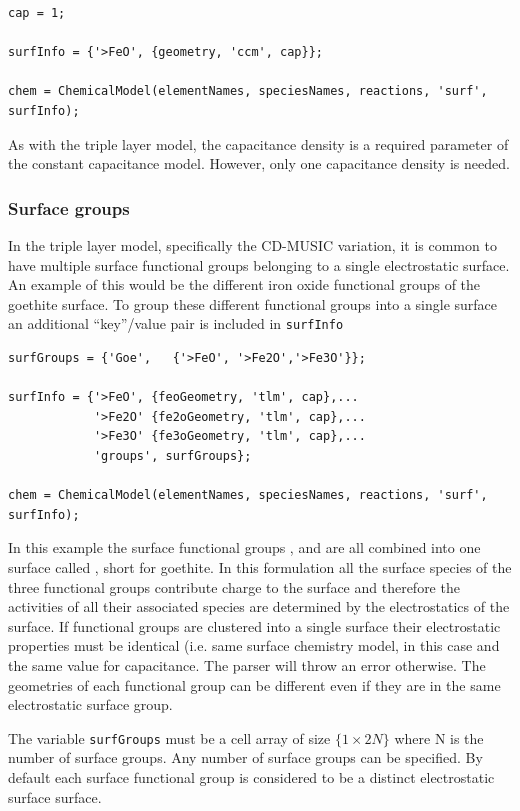 \documentclass{article}
\begin{document}
\begin{lstlisting}
cap = 1;

surfInfo = {'>FeO', {geometry, 'ccm', cap}};

chem = ChemicalModel(elementNames, speciesNames, reactions, 'surf', surfInfo);
\end{lstlisting}
As with the triple layer model, the capacitance density is a required parameter of the constant capacitance model. However, only one capacitance density is needed. 

\subsubsection{Surface groups}\label{sec:groups}
In the triple layer model, specifically the CD-MUSIC variation, it is common to have multiple surface functional groups belonging to a single electrostatic surface. An example of this would be the different iron oxide functional groups of the goethite surface. To group these different functional groups into a single surface an additional ``key''/value pair is included in \verb|surfInfo|

\begin{lstlisting}
surfGroups = {'Goe',   {'>FeO', '>Fe2O','>Fe3O'}};

surfInfo = {'>FeO', {feoGeometry, 'tlm', cap},...
            '>Fe2O' {fe2oGeometry, 'tlm', cap},...
            '>Fe3O' {fe3oGeometry, 'tlm', cap},...
            'groups', surfGroups};

chem = ChemicalModel(elementNames, speciesNames, reactions, 'surf', surfInfo);
\end{lstlisting}
In this example the surface functional groups ,  and  are all combined into one surface called , short for goethite. In this formulation all the surface species of the three functional groups contribute charge to the  surface and therefore the activities of all their associated species are determined by the electrostatics of the  surface. If functional groups are clustered into a single surface their electrostatic properties must be identical (i.e. same surface chemistry model, in this case  and the same value for capacitance. The parser will throw an error otherwise. The geometries of each functional group can be different even if they are in the same electrostatic surface group. 

The variable \verb|surfGroups| must be a cell array of size $\{1\times2N\}$ where N is the number of surface groups. Any number of surface groups can be specified. By default each surface functional group is considered to be a distinct electrostatic surface surface.
\end{document}

